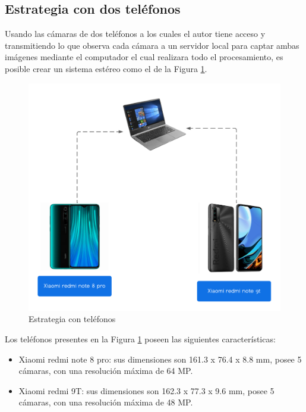 \subsection{Estrategia con dos teléfonos}
Usando las cámaras de dos teléfonos a los cuales el autor tiene acceso y transmitiendo lo que observa cada cámara a un servidor local para captar ambas imágenes mediante el computador el cual realizara todo el procesamiento, es posible crear un sistema estéreo como el de la Figura \ref{estrategia_phone}.
\begin{figure}[H]
    \centering
    \includegraphics[scale=0.5]{Recursos/estrategia_telefonos.png}
    \caption{Estrategia con teléfonos}
    \label{estrategia_phone}
\end{figure}
Los teléfonos presentes en la Figura \ref{estrategia_phone} poseen las siguientes características:
\begin{itemize}
    \item Xiaomi redmi note 8 pro: sus dimensiones son 161.3 x 76.4 x 8.8 mm, posee 5 cámaras, con una resolución máxima de 64 MP.
    \item Xiaomi redmi 9T: sus dimensiones son 162.3 x 77.3 x 9.6 mm, posee 5 cámaras, con una resolución máxima de 48 MP.
\end{itemize}
